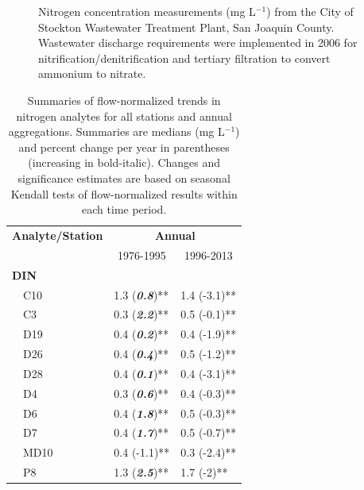\documentclass[journal = esthag, manuscript = article]{achemso}\usepackage[]{graphicx}\usepackage[]{color}
\begin{document}
\begin{suppinfo}
\begin{figure}[!ht]
{}

\caption[Nitrogen concentration measurements (mg L$^{-1}$) from the City of Stockton Wastewater Treatment Plant, San Joaquin County]{Nitrogen concentration measurements (mg L$^{-1}$) from the City of Stockton Wastewater Treatment Plant, San Joaquin County.  Wastewater discharge requirements were implemented in 2006 for nitrification/denitrification and tertiary filtration to convert ammonium to nitrate.}\label{fig:stock}
\end{figure}



\clearpage

\begin{table}[!tbp]
\caption{Summaries of flow-normalized trends in nitrogen analytes for all stations and annual aggregations.  Summaries are  medians (mg L$^{-1}$) and percent change per year in parentheses (increasing in bold-italic). Changes and significance estimates are based on seasonal Kendall tests of flow-normalized results within each time period.\label{tab:trndsann}} 
\begin{center}
\begin{tabular}{lll}
\hline\hline
\multicolumn{1}{l}{\bfseries Analyte/Station}&\multicolumn{2}{c}{\bfseries Annual}\tabularnewline
\cline{2-3}
\multicolumn{1}{l}{}&\multicolumn{1}{c}{1976-1995}&\multicolumn{1}{c}{1996-2013}\tabularnewline
\hline
{\bfseries DIN}&&\tabularnewline
~~C10&1.3 \footnotesize{(\textit{\textbf{0.8}})**}&1.4 \footnotesize{(-3.1)**}\tabularnewline
~~C3&0.3 \footnotesize{(\textit{\textbf{2.2}})**}&0.5 \footnotesize{(-0.1)**}\tabularnewline
~~D19&0.4 \footnotesize{(\textit{\textbf{0.2}})**}&0.4 \footnotesize{(-1.9)**}\tabularnewline
~~D26&0.4 \footnotesize{(\textit{\textbf{0.4}})**}&0.5 \footnotesize{(-1.2)**}\tabularnewline
~~D28&0.4 \footnotesize{(\textit{\textbf{0.1}})**}&0.4 \footnotesize{(-3.1)**}\tabularnewline
~~D4&0.3 \footnotesize{(\textit{\textbf{0.6}})**}&0.4 \footnotesize{(-0.3)**}\tabularnewline
~~D6&0.4 \footnotesize{(\textit{\textbf{1.8}})**}&0.5 \footnotesize{(-0.3)**}\tabularnewline
~~D7&0.4 \footnotesize{(\textit{\textbf{1.7}})**}&0.5 \footnotesize{(-0.7)**}\tabularnewline
~~MD10&0.4 \footnotesize{(-1.1)**}&0.3 \footnotesize{(-2.4)**}\tabularnewline
~~P8&1.3 \footnotesize{(\textit{\textbf{2.5}})**}&1.7 \footnotesize{(-2)**}\tabularnewline

\end{tabular}
\end{center}
\end{table}
\end{suppinfo}
\end{document}
